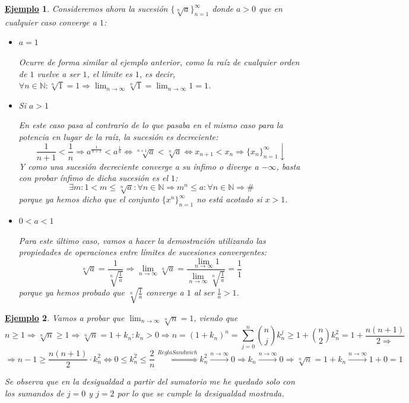 \documentclass[10pt,a4paper,openright]{book}
\theoremstyle{break}
\newtheorem{ej}{\underline{Ejemplo}}[chapter]
\begin{document}
\begin{ej}
Consideremos ahora la sucesión $\{\sqrt[n]{a}\}_{n=1}^\infty$ donde $a > 0$ que en cualquier caso converge a $1$:
\begin{itemize}
\item $a=1$

Ocurre de forma similar al ejemplo anterior, como la raíz de cualquier orden de $1$ vuelve a ser $1$, el límite es $1$, es decir, $\forall n \in \mathbb{N}: \sqrt[n]{1}=1 \Rightarrow \lim_{n\rightarrow\infty} \sqrt[n]{1} = \lim_{n\rightarrow\infty} 1 = 1$.

\item Si $a>1$

En este caso pasa al contrario de lo que pasaba en el mismo caso para la potencia en lugar de la raíz, la sucesión es decreciente:
\[
\frac{1}{n+1}<\frac{1}{n}\Rightarrow a^{\frac{1}{n+1}}<a^{\frac{1}{n}}\Leftrightarrow \sqrt[n+1]{a}<\sqrt[n]{a}\Leftrightarrow x_{n+1}< x_n\Rightarrow \{x_n\}_{n=1}^\infty \downarrow
\]
Y como una sucesión decreciente converge a su ínfimo o diverge a $-\infty$, basta con probar ínfimo de dicha sucesión es el $1$:
\[
\exists m: 1<m\leq \sqrt[n]{a}: \forall n\in \mathbb N\Rightarrow m^n\leq a : \forall n\in \mathbb N \Rightarrow \#
\]
porque ya hemos dicho que el conjunto $\{x^n\}_{n=1}^\infty$ no está acotado si $x>1$.

\item $0<a<1$

Para este último caso, vamos a hacer la demostración utilizando las propiedades de operaciones entre límites de sucesiones convergentes:
\[
\sqrt[n]{a} = \frac{1}{\sqrt[n]{\frac{1}{a}}} \Rightarrow \lim_{n\rightarrow \infty} \sqrt[n]{a} = \frac{\lim_{n\rightarrow \infty} 1}{\lim_{n\rightarrow \infty} \sqrt[n]{\frac{1}{a}}} = \frac{1}{1}
\]
porque ya hemos probado que $\sqrt[n]{\frac{1}{a}}$ converge a $1$ al ser $\frac{1}{a} > 1$.
\end{itemize}
\end{ej}

\begin{ej}
Vamos a probar que $\lim_{n\rightarrow \infty}\sqrt[n]{n}=1$, viendo que
$$n\geq 1\Rightarrow \sqrt[n]{n}\geq 1\Rightarrow \sqrt[n]{n}=1+k_n: k_n>0\Rightarrow n=(1+k_n)^n=\sum_{j=0}^n \binom{n}{j}k_n^j\geq 1+\binom{n}{2}k_n^2=1+\frac{n(n+1)}{2\Rightarrow}$$
$$\Rightarrow n-1\geq \frac{n(n+1)}{2}\cdot k_n^2\Leftrightarrow 0\leq k_n^2\leq \frac{2}{n}\stackrel{ReglaSandwich}{\Rightarrow} k_n^2\stackrel{n\rightarrow \infty}{\rightarrow} 0\Rightarrow k_n\stackrel{n\rightarrow \infty}{\rightarrow} 0\Rightarrow \sqrt[n]{n}=1+k_n \stackrel{n\rightarrow \infty}{\rightarrow} 1+0=1$$

Se observa que en la desigualdad a partir del sumatorio me he quedado solo con los sumandos de $j=0$ y $j=2$ por lo que se cumple la desigualdad mostrada.
\end{ej}
\end{document}
